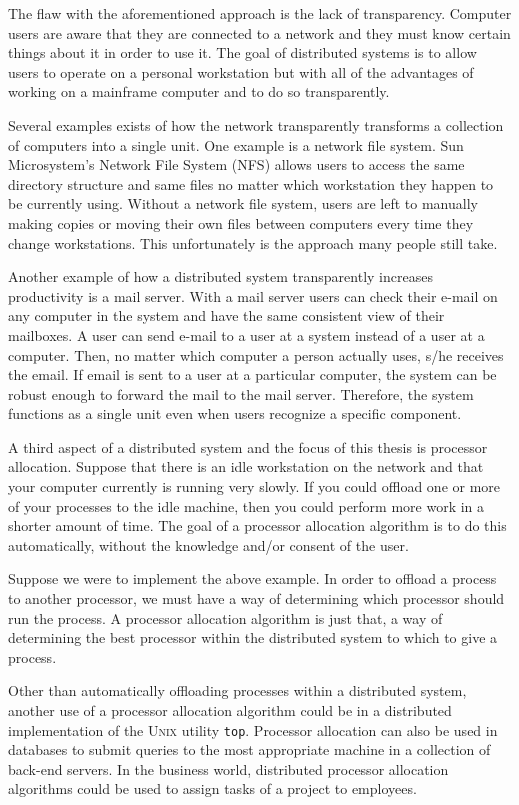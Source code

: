 \documentclass{report}
\newcommand{\UNIX}{\textsc{Unix}\xspace}
\begin{document}
The flaw with the aforementioned approach is the lack of transparency.
Computer users are aware that they are connected to a network and they must
know certain things about it in order to use it.  The goal of distributed
systems is to allow users to operate on a personal workstation but with all
of the advantages of working on a mainframe computer and to do so
transparently.  

Several examples exists of how the network transparently transforms a
collection of computers into a single unit.  One example is a network file
system.  Sun Microsystem's Network File System (NFS) allows users to access
the same directory structure and same files no matter which workstation they
happen to be currently using.  Without a network file system, users are left
to manually making copies or moving their own files between computers every
time they change workstations.  This unfortunately is the approach many
people still take.

Another example of how a distributed system transparently increases
productivity is a mail server.  With a mail server users can check their
e-mail on any computer in the system and have the same consistent view of
their mailboxes.  A user can send e-mail to a user at a system instead of a
user at a computer.  Then, no matter which computer a person actually uses,
s/he receives the email.  If email is sent to a user at a particular
computer, the system can be robust enough to forward the mail to the mail
server.  Therefore, the system functions as a single unit even when users
recognize a specific component.

A third aspect of a distributed system and the focus of this thesis is
processor allocation.  Suppose that there is an idle workstation on the
network and that your computer currently is running very slowly.  If you
could offload one or more of your processes to the idle machine, then you
could perform more work in a shorter amount of time.  The goal of a
processor allocation algorithm is to do this automatically, without the
knowledge and/or consent of the user.

Suppose we were to implement the above example.  In order to offload a
process to another processor, we must have a way of determining which
processor should run the process.  A processor allocation algorithm is just
that, a way of determining the best processor within the distributed system
to which to give a process.

Other than automatically offloading processes within a distributed system,
another use of a processor allocation algorithm could be in a distributed
implementation of the \UNIX utility \texttt{top}.  Processor allocation can
also be used in databases to submit queries to the most appropriate machine
in a collection of back-end servers.  In the business world, distributed
processor allocation algorithms could be used to assign tasks of a project
to employees.
\end{document}
